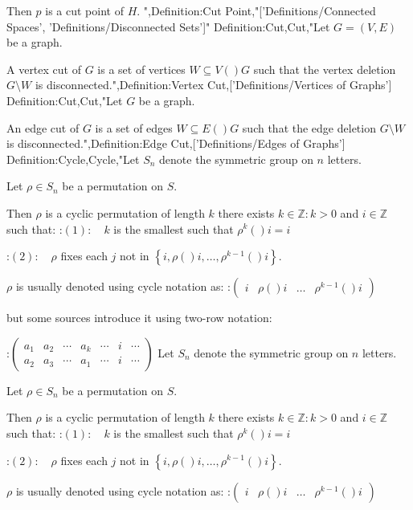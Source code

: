 Then $p$ is a cut point of $H$.
",Definition:Cut Point,"['Definitions/Connected Spaces', 'Definitions/Disconnected Sets']"
Definition:Cut,Cut,"Let $G = \left( V, E \right)$ be a graph.


A vertex cut of $G$ is a set of vertices $W \subseteq V \left(   \right)G$ such that the vertex deletion $G \setminus W$ is disconnected.",Definition:Vertex Cut,['Definitions/Vertices of Graphs']
Definition:Cut,Cut,"Let $G$ be a graph.


An edge cut of $G$ is a set of edges $W \subseteq E \left(   \right)G$ such that the edge deletion $G \setminus W$ is disconnected.",Definition:Edge Cut,['Definitions/Edges of Graphs']
Definition:Cycle,Cycle,"Let $S_n$ denote the symmetric group on $n$ letters.

Let $\rho \in S_n$ be a permutation on $S$.


Then $\rho$ is a cyclic permutation of length $k$  there exists $k \in \mathbb Z: k > 0$ and $i \in \mathbb Z$ such that:
:$(1): \quad k$ is the smallest such that $\rho^k \left(   \right)i = i$

:$(2): \quad \rho$ fixes each $j$ not in $\left\lbrace i, \rho \left(   \right)i, \ldots, \rho^{k - 1}  \left(   \right)i \right\rbrace$.


$\rho$ is usually denoted using cycle notation as:
:$\begin{pmatrix} i & \rho \left(   \right)i & \ldots & \rho^{k - 1}  \left(   \right)i \end{pmatrix}$

but some sources introduce it using two-row notation:

:$\begin{pmatrix} a_1 & a_2 & \cdots & a_k & \cdots & i & \cdots \\ a_2 & a_3 & \cdots & a_1 & \cdots & i & \cdots \end{pmatrix}$
Let $S_n$ denote the symmetric group on $n$ letters.

Let $\rho \in S_n$ be a permutation on $S$.


Then $\rho$ is a cyclic permutation of length $k$  there exists $k \in \mathbb Z: k > 0$ and $i \in \mathbb Z$ such that:
:$(1): \quad k$ is the smallest such that $\rho^k \left(   \right)i = i$

:$(2): \quad \rho$ fixes each $j$ not in $\left\lbrace i, \rho \left(   \right)i, \ldots, \rho^{k - 1}  \left(   \right)i \right\rbrace$.


$\rho$ is usually denoted using cycle notation as:
:$\begin{pmatrix} i & \rho \left(   \right)i & \ldots & \rho^{k - 1}  \left(   \right)i \end{pmatrix}$


